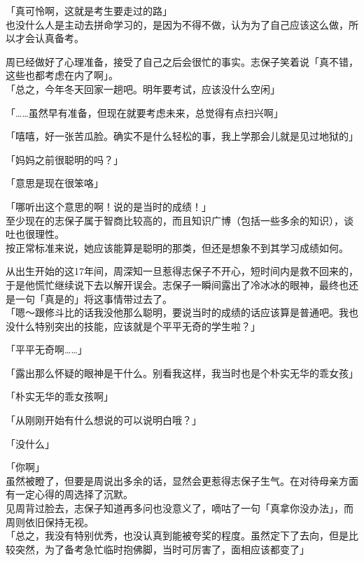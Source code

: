 「真可怜啊，这就是考生要走过的路」\\

也没什么人是主动去拼命学习的，是因为不得不做，认为为了自己应该这么做，所以才会认真备考。

周已经做好了心理准备，接受了自己之后会很忙的事实。志保子笑着说「真不错，这些也都考虑在内了啊」。\\

「总之，今年冬天回家一趟吧。明年要考试，应该没什么空闲」

「……虽然早有准备，但现在就要考虑未来，总觉得有点扫兴啊」

「嘻嘻，好一张苦瓜脸。确实不是什么轻松的事，我上学那会儿就是见过地狱的」

「妈妈之前很聪明的吗？」

「意思是现在很笨咯」

「哪听出这个意思的啊！说的是当时的成绩！」\\

至少现在的志保子属于智商比较高的，而且知识广博（包括一些多余的知识），谈吐也很理性。\\

按正常标准来说，她应该能算是聪明的那类，但还是想象不到其学习成绩如何。

从出生开始的这17年间，周深知一旦惹得志保子不开心，短时间内是救不回来的，于是他慌忙继续说下去以解开误会。志保子一瞬间露出了冷冰冰的眼神，最终也还是一句「真是的」将这事情带过去了。\\

「嗯～跟修斗比的话我没他那么聪明，要说当时的成绩的话应该算是普通吧。我也没什么特别突出的技能，应该就是个平平无奇的学生啦？」

「平平无奇啊……」

「露出那么怀疑的眼神是干什么。别看我这样，我当时也是个朴实无华的乖女孩」

「朴实无华的乖女孩啊」

「从刚刚开始有什么想说的可以说明白哦？」

「没什么」

「你啊」\\

虽然被瞪了，但要是周说出多余的话，显然会更惹得志保子生气。在对待母亲方面有一定心得的周选择了沉默。\\

见周背过脸去，志保子知道再多问也没意义了，嘀咕了一句「真拿你没办法」，而周则依旧保持无视。\\

「总之，我没有特别优秀，也没认真到能被夸奖的程度。虽然定下了去向，但是比较突然，为了备考急忙临时抱佛脚，当时可厉害了，面相应该都变了」

